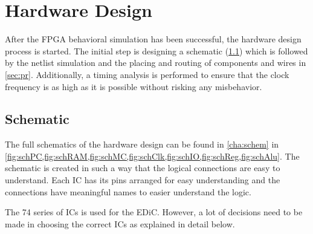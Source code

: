 \chapter{Hardware Design}\label{cha:hardware}
After the \gls{FPGA} behavioral simulation has been successful, the hardware design process is started.
The initial step is designing a schematic (\cref{sec:sch}) which is followed by the netlist simulation and the placing and routing of components and wires in \cref{sec:pr}.
Additionally, a timing analysis is performed to ensure that the clock frequency is as high as it is possible without risking any misbehavior.

\section{Schematic}\label{sec:sch}
The full schematics of the hardware design can be found in \cref{cha:schem} in \cref{fig:schPC,fig:schRAM,fig:schMC,fig:schClk,fig:schIO,fig:schReg,fig:schAlu}.
The schematic is created in such a way that the logical connections are easy to understand.
Each \gls{IC} has its pins arranged for easy understanding and the connections have meaningful names to easier understand the logic.

The 74 series of \glspl{IC} is used for the \gls{EDiC}.
However, a lot of decisions need to be made in choosing the correct \glspl{IC} as explained in detail below.
